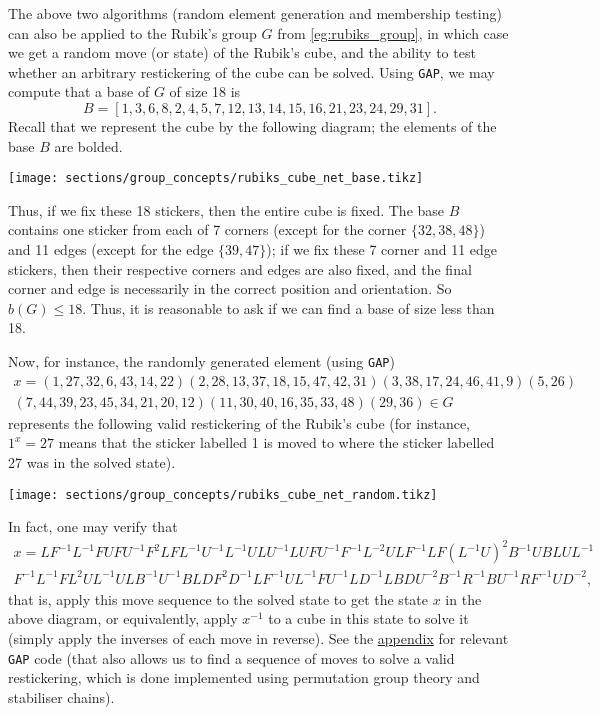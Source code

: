 \begin{example}\label{eg:rubiks_group_random}
    The above two algorithms (random element generation and membership testing) can also be applied to the Rubik's group $G$ from \autoref{eg:rubiks_group}, in which case we get a random move (or state) of the Rubik's cube, and the ability to test whether an arbitrary restickering of the cube can be solved. Using \texttt{GAP}, we may compute that a base of $G$ of size 18 is
    $$B = [ 1, 3, 6, 8, 2, 4, 5, 7, 12, 13, 14, 15, 16, 21, 23, 24, 29, 31 ].$$
    Recall that we represent the cube by the following diagram; the elements of the base $B$ are bolded.

    \begin{center}
        \texttt{[image: sections/group\_concepts/rubiks\_cube\_net\_base.tikz]}
    \end{center}
    Thus, if we fix these 18 stickers, then the entire cube is fixed. The base $B$ contains one sticker from each of 7 corners (except for the corner $\{32,38,48\}$) and 11 edges (except for the edge $\{39,47\}$); if we fix these 7 corner and 11 edge stickers, then their respective corners and edges are also fixed, and the final corner and edge is necessarily in the correct position and orientation. So $b(G) \leq 18$. Thus, it is reasonable to ask if we can find a base of size less than 18.
    
    Now, for instance, the randomly generated element (using \texttt{GAP})
    \begin{multline*}
        x = (1,27,32,6,43,14,22)(2,28,13,37,18,15,47,42,31)(3,38,17,24,46,41,9)(5,26)\\
        (7,44,39,23,45,34,21,20,12)(11,30,40,16,35,33,48)(29,36) \in G
    \end{multline*}
    represents the following valid restickering of the Rubik's cube (for instance, $1^x = 27$ means that the sticker labelled 1 is moved to where the sticker labelled 27 was in the solved state).

    \begin{center}
        \texttt{[image: sections/group\_concepts/rubiks\_cube\_net\_random.tikz]}
    \end{center}

    In fact, one may verify that
    \begin{multline*}
        x = LF^{-1}L^{-1}FUFU^{-1}F^2LFL^{-1}U^{-1}L^{-1}ULU^{-1}LUFU^{-1}F^{-1}L^{-2}ULF^{-1}LF(L^{-1}U)^2B^{-1}UBLUL^{-1} \\
        F^{-1}L^{-1}FL^2UL^{-1}ULB^{-1}U^{-1}BLDF^2D^{-1}LF^{-1}UL^{-1}FU^{-1}LD^{-1}LBDU^{-2}B^{-1}R^{-1}BU^{-1}RF^{-1}UD^{-2},
    \end{multline*}
    that is, apply this move sequence to the solved state to get the state $x$ in the above diagram, or equivalently, apply $x^{-1}$ to a cube in this state to solve it (simply apply the inverses of each move in reverse). See the \hyperref[app:rubiks_group]{appendix} for relevant \texttt{GAP} code (that also allows us to find a sequence of moves to solve a valid restickering, which is done implemented using permutation group theory and stabiliser chains).
\end{example}

